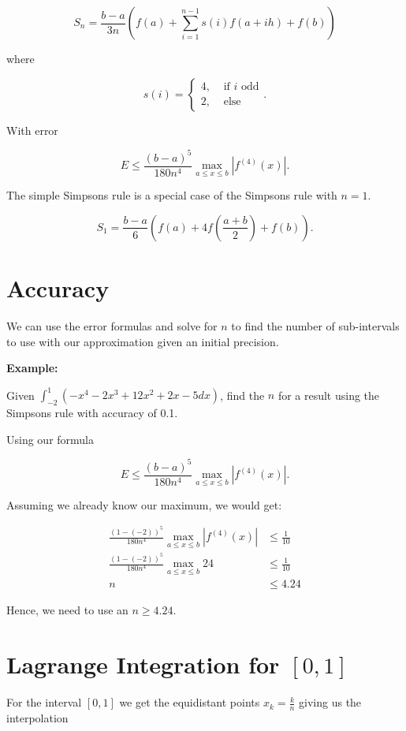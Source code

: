 \[
    S_n = \frac{b - a}{3n} \left(f(a) +  \sum_{i = 1}^{n - 1} s(i)f(a + ih)  + f(b)\right)
\]

where

\[
    s(i) = \begin{cases}
        4, & \text{ if } i \text{ odd}\\ 
        2, & \text{ else }
    \end{cases}.
\]

With error 

\[
    E \le \frac{(b - a)^5}{180 n^4} \max_{a \le x \le b} |f^{(4)}(x)|.
\]

The simple Simpsons rule is a special case of the Simpsons rule with \(n = 1\).

\[
    S_1 = \frac{b - a}{6} (f(a) + 4f\left(\frac{a + b}{2}\right) + f(b)).
\]

\section{Accuracy}

We can use the error formulas and solve for \(n\) to find the number of sub-intervals to 
use with our approximation given an initial precision.

\textbf{Example:}

Given \(\int_{-2}^{1} (-x^4 - 2x^3 + 12x^2 + 2x -5 dx)\), find the \(n\) for a result using the Simpsons rule with 
accuracy of 0.1. 

Using our formula 

\[
    E \le \frac{(b - a)^5}{180 n^4} \max_{a \le x \le b} |f^{(4)}(x)|.
\]

Assuming we already know our maximum, we would get: 

\begin{align*}
    \frac{(1 - (-2))^5}{180 n^4} \max_{a \le x \le b} |f^{(4)}(x)| &\le \frac{1}{10} \\
    \frac{(1 - (-2))^5}{180 n^4} \max_{a \le x \le b} 24  &\le \frac{1}{10} \\
     n &\le  4.24
\end{align*}

Hence, we need to use an \(n \ge 4.24\).


\section{Lagrange Integration for \texorpdfstring{\([0, 1]\)}{}}

For the interval \([0,1]\) we get the equidistant points \(x_k = \frac{k}{n}\) giving 
us the interpolation 

